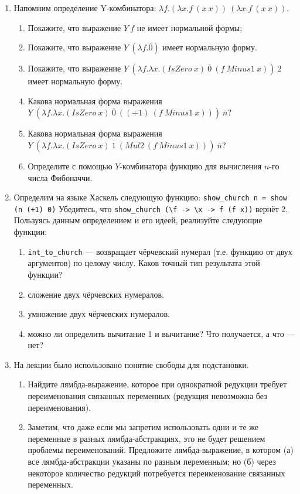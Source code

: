 \documentclass[10pt,a4paper,oneside]{article}
\begin{document}
\begin{enumerate}
\item Напомним определение Y-комбинатора: $\lambda f.(\lambda x.f\ (x\ x))\ (\lambda x.f\ (x\ x))$.
\begin{enumerate}
\item Покажите, что выражение $Y\ f$ не имеет нормальной формы;
\item Покажите, что выражение $Y\ (\lambda f.\overline{0})$ имеет нормальную форму.
\item Покажите, что выражение $Y\ (\lambda f.\lambda x.(IsZero\ x)\ \overline{0}\ (f\ Minus1\ x))\ 2$ имеет нормальную форму.
\item Какова нормальная форма выражения $Y\ (\lambda f.\lambda x.(IsZero\ x)\ \overline{0}\ ((+1)\ (f\ Minus1\ x)))\ \overline{n}$?
\item Какова нормальная форма выражения $Y\ (\lambda f.\lambda x.(IsZero\ x)\ \overline{1}\ (Mul2\ (f\ Minus1\ x)))\ \overline{n}$?
\item Определите с помощью $Y$-комбинатора функцию для вычисления $n$-го числа Фибоначчи.
\end{enumerate}

\item Определим на языке Хаскель следующую функцию: \verb!show_church n = show (n (+1) 0)!
Убедитесь, что \verb!show_church (\f -> \x -> f (f x))! вернёт 2. 
Пользуясь данным определением и его идеей, реализуйте следующие функции:

\begin{enumerate}
\item \verb!int_to_church! --- возвращает чёрчевский нумерал (т.е. функцию от двух аргументов) по целому числу.
Каков точный тип результата этой функции?
\item сложение двух чёрчевских нумералов.
\item умножение двух чёрчевских нумералов.
\item можно ли определить вычитание 1 и вычитание? Что получается, а что --- нет?
\end{enumerate}

\item На лекции было использовано понятие свободы для подстановки. 
\begin{enumerate}
\item Найдите лямбда-выражение, которое при однократной редукции требует переименования связанных переменных
(редукция невозможна без переименования). 
\item Заметим, что даже если мы запретим использовать одни и те же переменные в разных лямбда-абстракциях,
это не будет решением проблемы переименований. Предложите лямбда-выражение, в котором (а) все лямбда-абстракции
указаны по разным переменным; но (б) через некоторое количество редукций потребуется переименование
связанных переменных.
\end{enumerate}


\end{enumerate}
\end{document}
